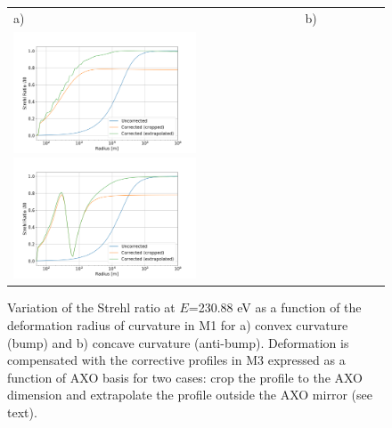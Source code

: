 \documentclass{iucr}              %
\begin{document}
  \begin{figure}
  \label{fig:strehlRatioVersusR} 
  \begin{center}
  \begin{tabular}{l} 
  a)~~~~~~~~~~~~~~~~~~~~~~~~~~~~~~~~~~~~~~~~~~~~~b) \\
  \includegraphics[width=0.5\textwidth]{figures/scan_peak_vs_negative_radius.png}
    \includegraphics[width=0.5\textwidth]{figures/scan_peak_vs_positive_radius.png} 
  
  \end{tabular}
  \end{center}
  \caption{
Variation of the Strehl ratio at $E$=230.88 eV as a function of the deformation radius of curvature in M1 for a) convex curvature (bump) and b) concave curvature (anti-bump). Deformation is compensated with the corrective profiles in M3 expressed as a function of AXO basis for two cases: crop the profile to the AXO dimension and extrapolate the profile outside the AXO mirror (see text).}
  \end{figure} 
\end{document}
